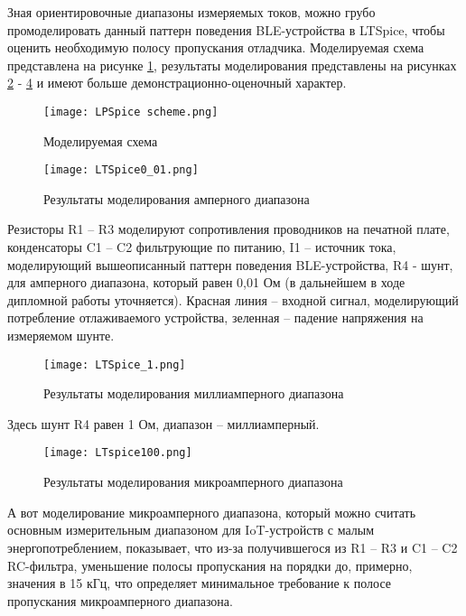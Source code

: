 Зная ориентировочные диапазоны измеряемых токов, можно грубо промоделировать данный паттерн 
поведения BLE-устройства в LTSpice, чтобы оценить необходимую полосу пропускания отладчика. 
Моделируемая схема представлена на рисунке \ref{ris:LTSpiceScheme}, результаты моделирования 
представлены на рисунках \ref{ris:LTSpice0_01} - \ref{ris:LTSpice100} и имеют больше 
демонстрационно-оценочный характер.

\begin{figure}[H]
  \centering
  \texttt{[image: LPSpice scheme.png]}
  \caption{Моделируемая схема}
  \label{ris:LTSpiceScheme}
\end{figure}

\begin{figure}[H]
  \centering
  \texttt{[image: LTSpice0\_01.png]}
  \caption{Результаты моделирования амперного диапазона }
  \label{ris:LTSpice0_01}
\end{figure}

Резисторы R1 -- R3 моделируют сопротивления проводников на печатной плате, конденсаторы C1 -- C2 фильтрующие 
по питанию, I1 -- источник тока, моделирующий вышеописанный паттерн поведения BLE-устройства,
R4 - шунт, для амперного диапазона, который равен 0,01 Ом (в дальнейшем в ходе дипломной работы уточняется). 
Красная линия -- входной сигнал, моделирующий потребление отлаживаемого устройства, 
зеленная -- падение напряжения на измеряемом шунте. 

\begin{figure}[H]
  \centering
  \texttt{[image: LTSpice\_1.png]}
  \caption{Результаты моделирования миллиамперного диапазона }
  \label{ris:LTSpice_1}
\end{figure}

Здесь шунт R4 равен 1 Ом, диапазон -- миллиамперный. 

\begin{figure}[H]
  \centering
  \texttt{[image: LTspice100.png]}
  \caption{Результаты моделирования микроамперного диапазона }
  \label{ris:LTSpice100}
\end{figure}

А вот моделирование микроамперного диапазона, который можно считать основным измерительным диапазоном для 
IoT-устройств с малым энергопотреблением, показывает, что из-за получившегося из R1 -- R3 и C1 -- C2 RC-фильтра,
уменьшение полосы пропускания на порядки до, примерно, значения в 15 кГц, что определяет минимальное
требование к полосе пропускания микроамперного диапазона. 
  

